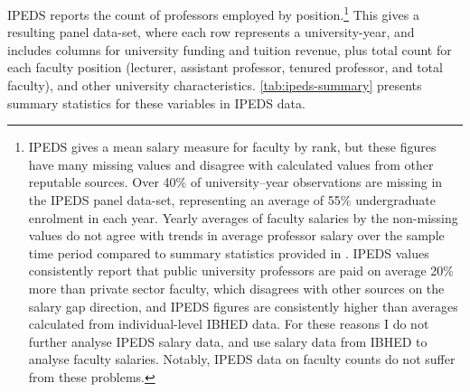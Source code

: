 IPEDS reports the count of professors employed by position.\footnote{
    IPEDS gives a mean salary measure for faculty by rank, but these figures have many missing values and disagree with calculated values from other reputable sources.
    Over 40\% of university--year observations are missing in the IPEDS panel data-set, representing an average of 55\% undergraduate enrolment in each year.
    Yearly averages of faculty salaries by the non-missing values do not agree with trends in average professor salary over the sample time period compared to summary statistics provided in \cite{aau2021survey}.
    IPEDS values consistently report that public university professors are paid on average 20\% more than private sector faculty, which disagrees with other sources on the salary gap direction, and IPEDS figures are consistently higher than averages calculated from individual-level IBHED data.
    For these reasons I do not further analyse IPEDS salary data, and use salary data from IBHED to analyse faculty salaries.
    Notably, IPEDS data on faculty counts do not suffer from these problems.
}
This gives a resulting panel data-set, where each row represents a university-year, and includes columns for university funding and tuition revenue, plus total count for each faculty position (lecturer, assistant professor, tenured professor, and total faculty), and other university characteristics.
\autoref{tab:ipeds-summary} presents summary statistics for these variables in IPEDS data.

